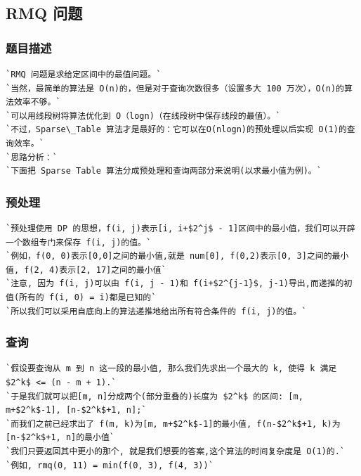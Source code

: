 \documentclass[a4paper]{article}
\begin{document}
\begin{CJK*}{UTF8}{gbsn}
\begin{multicols}{3}
\begin{flushleft}
\subsection{RMQ 问题}

\subsubsection{题目描述}
\begin{lstlisting}
`RMQ 问题是求给定区间中的最值问题。`
`当然，最简单的算法是 O(n)的，但是对于查询次数很多（设置多大 100 万次），O(n)的算法效率不够。`
`可以用线段树将算法优化到 O（logn)（在线段树中保存线段的最值）。`
`不过，Sparse\_Table 算法才是最好的：它可以在O(nlogn)的预处理以后实现 O(1)的查询效率。`
`思路分析：`
`下面把 Sparse Table 算法分成预处理和查询两部分来说明(以求最小值为例)。`
\end{lstlisting}

\subsubsection{预处理}
\begin{lstlisting}
`预处理使用 DP 的思想，f(i, j)表示[i, i+$2^j$ - 1]区间中的最小值，我们可以开辟一个数组专门来保存 f(i, j)的值。`
`例如，f(0, 0)表示[0,0]之间的最小值,就是 num[0], f(0,2)表示[0, 3]之间的最小值, f(2, 4)表示[2, 17]之间的最小值`
`注意, 因为 f(i, j)可以由 f(i, j - 1)和 f(i+$2^{j-1}$, j-1)导出,而递推的初值(所有的 f(i, 0) = i)都是已知的`
`所以我们可以采用自底向上的算法递推地给出所有符合条件的 f(i, j)的值。`
\end{lstlisting}

\subsubsection{查询}
\begin{lstlisting}
`假设要查询从 m 到 n 这一段的最小值, 那么我们先求出一个最大的 k, 使得 k 满足 $2^k$ <= (n - m + 1).`
`于是我们就可以把[m, n]分成两个(部分重叠的)长度为 $2^k$ 的区间: [m, m+$2^k$-1], [n-$2^k$+1, n];`
`而我们之前已经求出了 f(m, k)为[m, m+$2^k$-1]的最小值, f(n-$2^k$+1, k)为[n-$2^k$+1, n]的最小值`
`我们只要返回其中更小的那个, 就是我们想要的答案,这个算法的时间复杂度是 O(1)的.`
`例如, rmq(0, 11) = min(f(0, 3), f(4, 3))`
\end{lstlisting}


\end{flushleft}
\end{multicols}
\end{CJK*}
\end{document}

